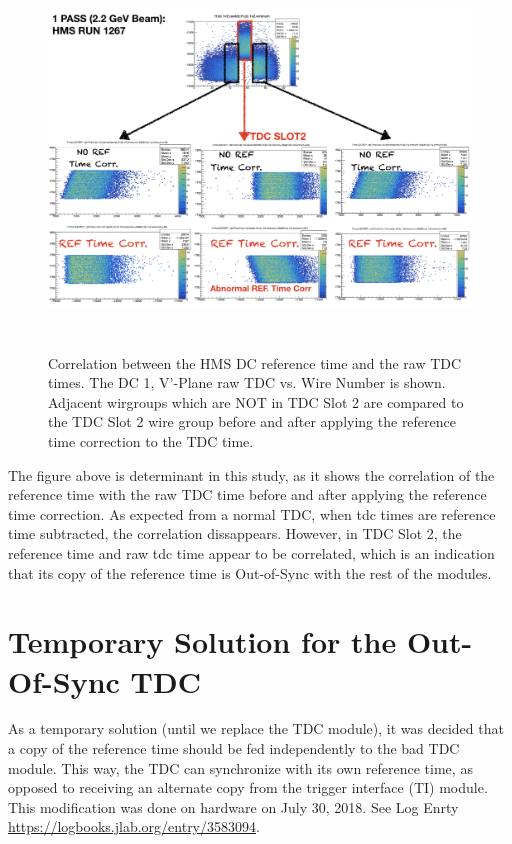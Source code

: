 \documentclass[11pt]{article}
\begin{document}
\begin{figure}[h!]
  \centering
  \includegraphics[width=6.0in, height=4.0in]{hDC_RefTime_correlation.png}
  \caption{Correlation between the HMS DC reference time and the raw TDC times. The DC 1, V'-Plane raw TDC vs. Wire Number is shown. Adjacent wirgroups which
  are NOT in TDC Slot 2 are compared to the TDC Slot 2 wire group before and after applying the reference time correction to the TDC time.}
  \label{fig:wire_residual}
\end{figure}

\newpage
The figure above is determinant in this study, as it shows the correlation of the reference time with the raw TDC time before and after applying the reference time correction.
As expected from a normal TDC, when tdc times are reference time subtracted, the correlation dissappears. However, in TDC Slot 2, the reference time and raw tdc time appear to be
correlated, which is an indication that its copy of the reference time is Out-of-Sync with the rest of the modules.

\section{Temporary Solution for the Out-Of-Sync TDC}
\indent As a temporary solution (until we replace the TDC module), it was decided that a copy of the reference time should be fed independently to the bad TDC module. This way, the TDC can synchronize with its own
reference time, as opposed to receiving an alternate copy from the trigger interface (TI) module. This modification was done on hardware on July 30, 2018. See Log Enrty \url{https://logbooks.jlab.org/entry/3583094}.
\end{document}

